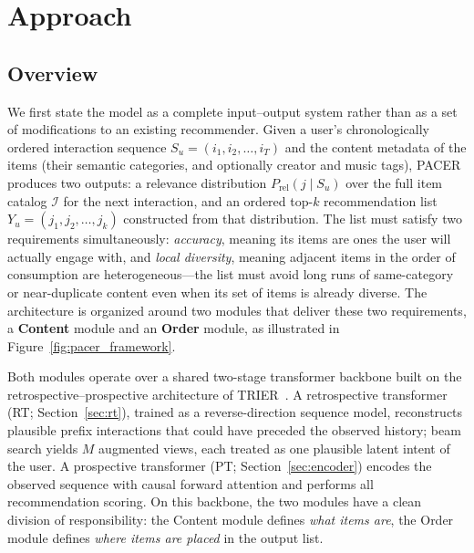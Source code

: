
\section{Approach}
\label{sec:approach}

\subsection{Overview}
\label{sec:overview}
We first state the model as a complete input--output system rather than as a set of modifications to an existing recommender. Given a user's chronologically ordered interaction sequence $S_u = (i_1, i_2, \dots, i_T)$ and the content metadata of the items (their semantic categories, and optionally creator and music tags), PACER produces two outputs: a relevance distribution $P_{\mathrm{rel}}(j \mid S_u)$ over the full item catalog $\mathcal{I}$ for the next interaction, and an ordered top-$k$ recommendation list $Y_u = (j_1, j_2, \dots, j_k)$ constructed from that distribution. The list must satisfy two requirements simultaneously: \emph{accuracy}, meaning its items are ones the user will actually engage with, and \emph{local diversity}, meaning adjacent items in the order of consumption are heterogeneous---the list must avoid long runs of same-category or near-duplicate content even when its set of items is already diverse. The architecture is organized around two modules that deliver these two requirements, a \textbf{Content} module and an \textbf{Order} module, as illustrated in Figure~\ref{fig:pacer_framework}.

Both modules operate over a shared two-stage transformer backbone built on the retrospective--prospective architecture of TRIER~\cite{shi2024trier}. A retrospective transformer (RT; Section~\ref{sec:rt}), trained as a reverse-direction sequence model, reconstructs plausible prefix interactions that could have preceded the observed history; beam search yields $M$ augmented views, each treated as one plausible latent intent of the user. A prospective transformer (PT; Section~\ref{sec:encoder}) encodes the observed sequence with causal forward attention and performs all recommendation scoring. On this backbone, the two modules have a clean division of responsibility: the Content module defines \emph{what items are}, the Order module defines \emph{where items are placed} in the output list.


